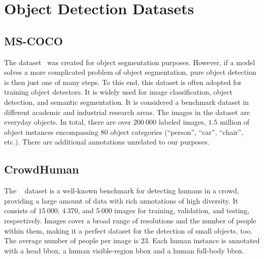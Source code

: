 \section{Object Detection Datasets}
\label{sec:ObjectDetectionDatasets}

\subsection{MS-COCO}
\label{ssec:DatasetMSCOCO}

The \mscoco{} dataset~\cite{lin2014mscoco} was created for object segmentation purposes. However, if a model solves a more complicated problem of object segmentation, pure object detection is then just one of many steps. To this end, this dataset is often adopted for training object detectors. It is widely used for image classification, object detection, and semantic segmentation. It is considered a benchmark dataset in different academic and industrial research areas. The images in the dataset are everyday objects. In total, there are over $200\ 000$ labeled images, $1.5$ million of object instances encompassing $80$ object categories (``person'', ``car'', ``chair'', etc.). There are additional annotations unrelated to our purposes.

\subsection{CrowdHuman}
\label{ssec:DatasetCrowdHuman}

The \crowdhuman{}~\cite{shao2018crowdhuman} dataset is a well-known benchmark for detecting humans in a crowd, providing a large amount of data with rich annotations of high diversity. It consists of $15\ 000$, $4\ 370$, and $5\ 000$ images for training, validation, and testing, respectively. Images cover a broad range of resolutions and the number of people within them, making it a perfect dataset for the detection of small objects, too. The average number of people per image is $23$. Each human instance is annotated with a head \gls{bbox}, a human visible-region \gls{bbox} and a human full-body \gls{bbox}.